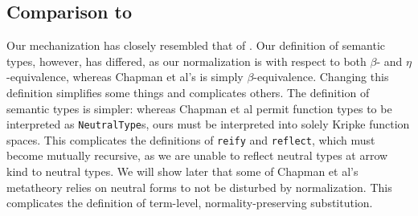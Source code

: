 \documentclass[authoryear, acmsmall, screen, review, nonacm]{acmart}
\begin{document}
\subsection{Comparison to \citet{ChapmanKNW19}}
Our mechanization has closely resembled that of \citet{ChapmanKNW19}. Our definition of semantic types, however, has differed, as our normalization is with respect to both $\beta$- and $\eta$-equivalence, whereas Chapman et al's is simply $\beta$-equivalence. Changing this definition simplifies some things and complicates others. The definition of semantic types is simpler: whereas Chapman et al permit function types to be interpreted as \verb!NeutralType!s, ours must be interpreted into solely Kripke function spaces. This complicates the definitions of \verb!reify! and \verb!reflect!, which must become mutually recursive, as we are unable to reflect neutral types at arrow kind to neutral types. We will show later that some of Chapman et al's metatheory relies on neutral forms to not be disturbed by normalization. This complicates the definition of term-level, normality-preserving substitution.




\end{document}
